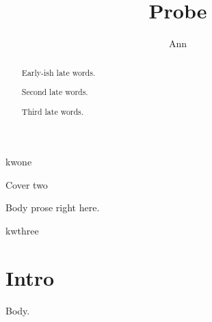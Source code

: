 \documentclass{IEEEtran}
\begin{document}
\title{Probe}\author{Ann}
\maketitle
\begin{abstract}Early-ish late words.\end{abstract}
\begin{IEEEkeywords}kwone\end{IEEEkeywords}
\begin{center}Cover two\end{center}
\begin{abstract}Second late words.\end{abstract}
Body prose right here.

\begin{abstract}Third late words.\end{abstract}
\begin{IEEEkeywords}kwthree\end{IEEEkeywords}
\section{Intro}
Body.
\end{document}
